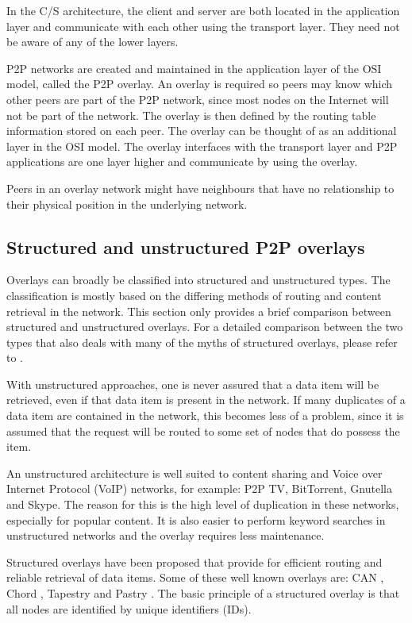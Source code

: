 In the C/S architecture, the client and server are both located in the application layer and communicate with each other using the transport layer. They need not be aware of any of the lower layers.

P2P networks are created and maintained in the application layer of the OSI model, called the P2P overlay. An overlay is required so peers may know which other peers are part of the P2P network, since most nodes on the Internet will not be part of the network. The overlay is then defined by the routing table information stored on each peer. The overlay can be thought of as an additional layer in the OSI model. The overlay interfaces with the transport layer and P2P applications are one layer higher and communicate by using the overlay.

Peers in an overlay network might have neighbours that have no relationship to their physical position in the underlying network.

\subsection{Structured and unstructured P2P overlays}
\label{overlays}

Overlays can broadly be classified into structured and unstructured types. The classification is mostly based on the differing methods of routing and content retrieval in the network. This section only provides a brief comparison between structured and unstructured overlays. For a detailed comparison between the two types that also deals with many of the myths of structured overlays, please refer to \cite{Castro_structured_overlay_myths}.

With unstructured approaches, one is never assured that a data item will be retrieved, even if that data item is present in the network. If many duplicates of a data item are contained in the network, this becomes less of a problem, since it is assumed that the request will be routed to some set of nodes that do  possess the item.

An unstructured architecture is well suited to content sharing and Voice over Internet Protocol (VoIP) networks, for example: P2P TV, BitTorrent, Gnutella and Skype. The reason for this is the high level of duplication in these networks, especially for popular content. It is also easier to perform keyword searches in unstructured networks and the overlay requires less maintenance.

Structured overlays have been proposed that provide for efficient routing and reliable retrieval of data items. Some of these well known overlays are: CAN \cite{CAN}, Chord \cite{chord}, Tapestry \cite{tapestry} and Pastry \cite{pastry}. The basic principle of a structured overlay is that all nodes are identified by unique identifiers (IDs).

